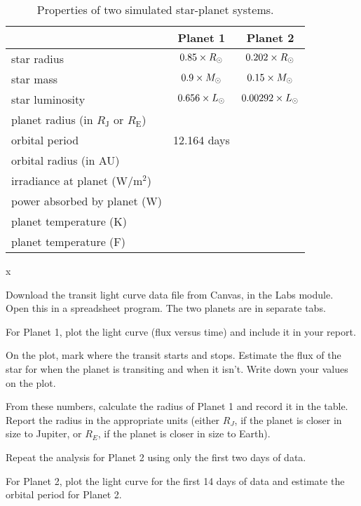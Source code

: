 \begin{table}
	\centering
	\begin{tabular}{l|c|c}
		\toprule
		& Planet 1 & Planet 2 \\
		\midrule
		star radius & $0.85 \times R_\textrm{\astrosun}$ & $0.202 \times R_\textrm{\astrosun}$  \\
		\midrule
		star mass & $0.9 \times M_\textrm{\astrosun}$ & $0.15 \times M_\textrm{\astrosun}$ \\
		\midrule
		star luminosity & $0.656 \times L_\textrm{\astrosun}$ & $0.00292 \times L_\textrm{\astrosun}$ \\
		\midrule
		planet radius (in $R_\textrm{J}$ or $R_\textrm{E}$) & & \\
		\midrule
		orbital period & 12.164 days & \\
		\midrule
		orbital radius (in AU) & & \\
		\midrule
		irradiance at planet (W$/$m$^2$) & & \\
		\midrule
		power absorbed by planet (W) & & \\
		\midrule
		planet temperature (K) & & \\
		\midrule
		planet temperature (\textdegree F) & & \\
		\bottomrule
	\end{tabular}
	\caption{Properties of two simulated star-planet systems.}\label{tr:tab:properties}
x\end{table}

\begin{steps}	
	
	\item Download the transit light curve data file from Canvas, in the Labs module. Open this in a spreadsheet program. The two planets are in separate tabs.
	
	\item For Planet 1, plot the light curve (flux versus time) and include it in your report.

	\item On the plot, mark where the transit starts
and stops. Estimate the flux of the star for when the planet is transiting
and when it isn’t. Write down your values on the plot.

	\item From these
numbers, calculate the radius of Planet 1 and record it in the table.
Report the radius in the appropriate units (either $R_J$, if the planet is
closer in size to Jupiter, or $R_E$, if the planet is closer in size to Earth).

	\item Repeat the analysis for Planet 2 using only the first two days of data.

	\item For Planet 2, plot the light curve for the first 14 days of data and
estimate the orbital period for Planet 2.
\end{steps}

